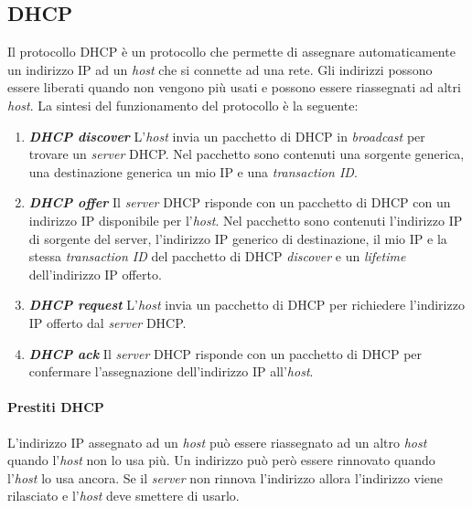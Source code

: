     \subsection[\textit{Dynamic Host Configuration Protocol} (\texttt{DHCP})]{\acrfull*{DHCP}}
        Il protocollo \Acrshort*{DHCP} è un protocollo che permette di assegnare automaticamente un indirizzo \Acrshort*{IP} ad un \textit{host} che si connette ad una rete. Gli indirizzi possono essere liberati quando non vengono più usati e possono essere riassegnati ad altri \textit{host}. La sintesi del funzionamento del protocollo è la seguente: \begin{enumerate}
            \item \textit{\textbf{\Acrshort*{DHCP} discover}} L'\textit{host} invia un pacchetto di \Acrshort*{DHCP} in \textit{broadcast} per trovare un \textit{server} \Acrshort*{DHCP}. Nel pacchetto sono contenuti una sorgente generica, una destinazione generica un mio \Acrshort*{IP} e una \textit{transaction ID}.
            \item \textit{\textbf{\Acrshort*{DHCP} offer}} Il \textit{server} \Acrshort*{DHCP} risponde con un pacchetto di \Acrshort*{DHCP} con un indirizzo \Acrshort*{IP} disponibile per l'\textit{host}. Nel pacchetto sono contenuti l'indirizzo \Acrshort*{IP} di sorgente del server, l'indirizzo \Acrshort*{IP} generico di destinazione, il mio \Acrshort*{IP} e la stessa \textit{transaction ID} del pacchetto di \Acrshort*{DHCP} \textit{discover} e un \textit{lifetime} dell'indirizzo \Acrshort*{IP} offerto.
            \item \textit{\textbf{\Acrshort*{DHCP} request}} L'\textit{host} invia un pacchetto di \Acrshort*{DHCP} per richiedere l'indirizzo \Acrshort*{IP} offerto dal \textit{server} \Acrshort*{DHCP}. 
            \item \textit{\textbf{\Acrshort*{DHCP} ack}} Il \textit{server} \Acrshort*{DHCP} risponde con un pacchetto di \Acrshort*{DHCP} per confermare l'assegnazione dell'indirizzo \Acrshort*{IP} all'\textit{host}.
        \end{enumerate}
        \paragraph{Prestiti \Acrshort*{DHCP}} L'indirizzo \Acrshort*{IP} assegnato ad un \textit{host} può essere riassegnato ad un altro \textit{host} quando l'\textit{host} non lo usa più. Un indirizzo può però essere rinnovato quando l'\textit{host} lo usa ancora. Se il \textit{server} non rinnova l'indirizzo allora l'indirizzo viene rilasciato e l'\textit{host} deve smettere di usarlo.
